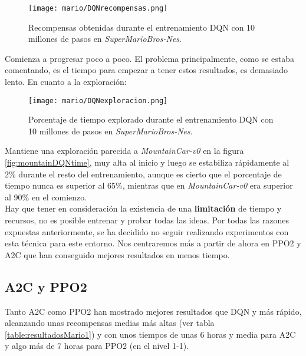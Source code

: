 \documentclass[11pt,fleqn]{book} %
\begin{document}
\begin{figure}[H]
	\centering\texttt{[image: mario/DQNrecompensas.png]}
	\caption{Recompensas obtenidas durante el entrenamiento DQN con 10 millones de pasos en \textit{SuperMarioBros-Nes}.}
	\label{fig:marioDQNrecompensas} %
\end{figure}

Comienza a progresar poco a poco. El problema principalmente, como se estaba comentando, es el tiempo para empezar a tener estos resultados, es demasiado lento. En cuanto a la exploración:

\begin{figure}[H]
	\centering\texttt{[image: mario/DQNexploracion.png]}
	\caption{Porcentaje de tiempo explorado durante el entrenamiento DQN con 10 millones de pasos en \textit{SuperMarioBros-Nes}.}
	\label{fig:marioDQNexploracion} %
\end{figure}

Mantiene una exploración parecida a \textit{MountainCar-v0} en la figura \ref{fig:mountainDQNtime}, muy alta al inicio y luego se estabiliza rápidamente al 2\% durante el resto del entrenamiento, aunque es cierto que el porcentaje de tiempo nunca es superior al 65\%, mientras que en \textit{MountainCar-v0} era superior al 90\% en el comienzo. \\

Hay que tener en consideración la existencia de una \textbf{limitación} de tiempo y recursos, no es posible entrenar y probar todas las ideas. Por todas las razones expuestas anteriormente, se ha decidido no seguir realizando experimentos con esta técnica para este entorno. Nos centraremos más a partir de ahora en PPO2 y A2C que han conseguido mejores resultados en menos tiempo.

\subsection{A2C y PPO2}

Tanto A2C como PPO2 han mostrado mejores resultados que DQN y más rápido, alcanzando unas recompensas medias más altas (ver tabla \ref{table:resultadosMario1}) y con unos tiempos de unas 6 horas y media para A2C y algo más de 7 horas para PPO2 (en el nivel 1-1). \\
\end{document}

